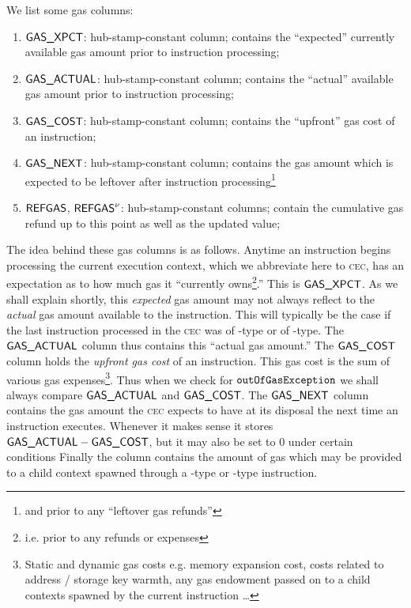 \noindent We list some gas columns:
\begin{enumerate}[resume]
	\item $\textsf{GAS}\textsf{\_XPCT}$:
		hub-stamp-constant column; contains the ``expected'' currently available  gas amount prior to instruction processing;
	\item $\textsf{GAS}\textsf{\_ACTUAL}$:
		hub-stamp-constant column; contains the ``actual'' available  gas amount prior to instruction processing;
	\item $\textsf{GAS}\textsf{\_COST}$:
		hub-stamp-constant column; contains the ``upfront'' gas cost of an instruction;
	\item $\textsf{GAS}\textsf{\_NEXT}$:
		hub-stamp-constant column; contains the gas amount which is expected to be leftover after instruction processing\footnote{and prior to any ``leftover gas refunds''}
	\item $\textsf{REFGAS}$, $\textsf{REFGAS}^{\nu}$:
		hub-stamp-constant columns; contain the cumulative gas refund up to this point as well as the updated value;
\end{enumerate}
The idea behind these gas columns is as follows.
Anytime an instruction begins processing the current execution context, which we abbreviate here to \textsc{cec}, has an expectation as to how much gas it ``currently owns\footnote{i.e. prior to any refunds or expenses}.''
This is $\textsf{GAS}\textsf{\_XPCT}$.
As we shall explain shortly, this \emph{expected} gas amount may not always reflect to the \emph{actual} gas amount available to the instruction.
This will typically be the case if the last instruction processed in the \textsc{cec} was of -type or of -type.
The $\textsf{GAS}\textsf{\_ACTUAL}$ column thus contains this ``actual gas amount.''
The $\textsf{GAS}\textsf{\_COST}$ column holds the \emph{upfront gas cost} of an instruction.
This gas cost is the sum of various gas expenses\footnote{Static and dynamic gas costs e.g. memory expansion cost, costs related to address / storage key warmth, any gas endowment passed on to a child contexts spawned by the current instruction \dots{}}.
Thus when we check for $\texttt{outOfGasException}$ we shall always compare $\textsf{GAS}\textsf{\_ACTUAL}$ and $\textsf{GAS}\textsf{\_COST}$.
The $\textsf{GAS}\textsf{\_NEXT}$ column contains the gas amount the \textsc{cec} expects to have at its disposal the next time an instruction executes.
Whenever it makes sense it stores $\textsf{GAS}\textsf{\_ACTUAL}- \textsf{GAS}\textsf{\_COST}$, but it may also be set to 0 under certain conditions
Finally the \gasStipend{} column contains the amount of gas which may be provided to a child context spawned through a -type or -type instruction. 

